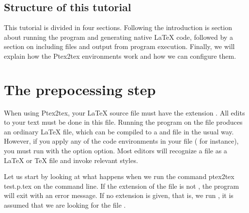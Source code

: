 \documentclass[a4paper,11pt]{article}
\begin{document}
\subsection{Structure of this tutorial}
This tutorial is divided in four sections. Following the introduction is 
section about running the  program and generating
native \LaTeX{} code, followed by a section on including files
and output from program execution. Finally, we will explain how the
Ptex2tex environments work and how we can configure them.

\section{The prepocessing step}
When using Ptex2tex, your \LaTeX{} source file must have the extension
. All edits to your text must be done in this file.
Running the program  on the  file produces
an ordinary \LaTeX{} file, which can be compiled to a  and
 file in the usual way. However, if you apply any of
the  code environments in your 
file ( for instance), you must run
 with the option  option.
Most editors will recognize a  file as a \LaTeX{} or \TeX{}
file and invoke relevant styles.

Let us start by looking at what happens when we run the command
\bsys
ptex2tex test.p.tex
\esys
on the command line. If the extension of
the file is not , the program will exit with an error
message. If no extension is given, that is, we run , it
is assumed that we are looking for the file .
\end{document}
